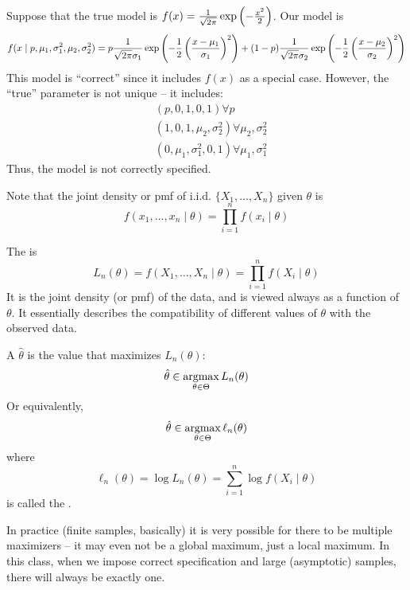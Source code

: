 \documentclass[10pt]{article}
\begin{document}
\begin{example}
	Suppose that the true model is $f(x) = \frac{1}{\sqrt{2\pi}} \exp\left( -\frac{x^2}{2}\right)$. Our model is
	\[
	f( x \mid p,\mu_1,\sigma_1^2,\mu_2,\sigma_2^2) = p \frac{1}{\sqrt{2\pi}\sigma_1} \exp\left( -\frac{1}{2} \left( \frac{x - \mu_1}{\sigma_1}\right)^2\right) + (1-p)\frac{1}{\sqrt{2\pi}\sigma_2} \exp\left( -\frac{1}{2} \left( \frac{x - \mu_2}{\sigma_2}\right)^2\right)
	\]
	This model is ``correct'' since it includes $f(x)$ as a special case. However, the ``true'' parameter is not unique -- it includes:
	\begin{align*}
		& (p,0,1,0,1) \forall p \\
		& (1,0,1,\mu_2,\sigma_2^2) \forall \mu_2,\sigma_2^2 \\
		& (0,\mu_1,\sigma_1^2,0,1) \forall \mu_1,\sigma_1^2
	\end{align*}
	Thus, the model is not correctly specified.
\end{example}

Note that the joint density or pmf of i.i.d. $\{X_1,\dots,X_n\}$ given $\theta$ is
\[
f(x_1,\dots,x_n \mid \theta) = \prod_{i=1}^n f(x_i \mid \theta)
\]

\begin{definition}
	The  is
	\[
	L_n(\theta) = f(X_1,\dots,X_n \mid \theta) = \prod_{i=1}^n f(X_i \mid \theta)
	\]
	It is the joint density (or pmf) of the data, and is viewed always as a function of $\theta$. It essentially describes the compatibility of different values of $\theta$ with the observed data.
\end{definition}

\begin{definition}
	A  $\hat{\theta}$ is the value that maximizes $L_n(\theta)$:
	\[
	\hat{\theta} \in \mathop{\rm argmax}_{\theta \in \Theta} L_n(\theta)
	\]
	Or equivalently,
	\[
	\hat{\theta} \in \mathop{\rm argmax}_{\theta \in \Theta} \ell_n(\theta)
	\]
	where 
	\[
	\ell_n(\theta) = \log L_n(\theta) = \sum_{i=1}^n \log f(X_i \mid \theta)
	\]
	is called the .
\end{definition}

\begin{remark}
	In practice (finite samples, basically) it is very possible for there to be multiple maximizers -- it may even not be a global maximum, just a local maximum. In this class, when we impose correct specification and large (asymptotic) samples, there will always be exactly one.
\end{remark}
\end{document}
